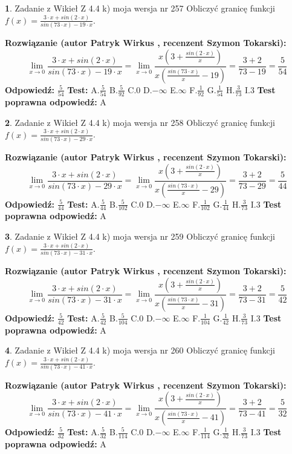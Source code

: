\documentclass[12pt, a4paper]{article}
\theoremstyle{definition} %
\newtheorem{zad}{}
\newcommand{\zadStart}[1]{\begin{zad}#1\newline}
\newcommand{\zadStop}{\end{zad}}
\newcommand{\rozwStart}[2]{\noindent \textbf{Rozwiązanie (autor #1 , recenzent #2): }\newline}
\newcommand{\rozwStop}{\newline}
\newcommand{\odpStart}{\noindent \textbf{Odpowiedź:}\newline}
\newcommand{\odpStop}{\newline}
\newcommand{\testStart}{\noindent \textbf{Test:}\newline}
\newcommand{\testStop}{\newline}
\newcommand{\kluczStart}{\noindent \textbf{Test poprawna odpowiedź:}\newline}
\newcommand{\kluczStop}{\newline}
\begin{document}
\zadStart{Zadanie z Wikieł Z 4.4 k) moja wersja nr 257}
Obliczyć granicę funkcji $f(x)=\frac{3\cdot x +sin(2\cdot x)}{sin(73\cdot x) -19\cdot x}$.
\zadStop
\rozwStart{Patryk Wirkus}{Szymon Tokarski}
$$\lim\limits_{x\to 0}\frac{3\cdot x +sin(2\cdot x)}{sin(73\cdot x) -19\cdot x}
=\lim\limits_{x\to 0}\frac{x(3+\frac{sin(2\cdot x)}{x})}{x(\frac{sin(73\cdot x)}{x}-19)}
=\frac{3+2}{73-19} = \frac{5}{54}$$
\rozwStop
\odpStart
$\frac{5}{54}$
\odpStop
\testStart
A.$\frac{5}{54}$
B.$\frac{5}{92}$
C.$0$
D.$-\infty$
E.$\infty$
F.$\frac{1}{92}$
G.$\frac{1}{54}$
H.$\frac{3}{73}$
I.$3$
\testStop
\kluczStart
A
\kluczStop



\zadStart{Zadanie z Wikieł Z 4.4 k) moja wersja nr 258}
Obliczyć granicę funkcji $f(x)=\frac{3\cdot x +sin(2\cdot x)}{sin(73\cdot x) -29\cdot x}$.
\zadStop
\rozwStart{Patryk Wirkus}{Szymon Tokarski}
$$\lim\limits_{x\to 0}\frac{3\cdot x +sin(2\cdot x)}{sin(73\cdot x) -29\cdot x}
=\lim\limits_{x\to 0}\frac{x(3+\frac{sin(2\cdot x)}{x})}{x(\frac{sin(73\cdot x)}{x}-29)}
=\frac{3+2}{73-29} = \frac{5}{44}$$
\rozwStop
\odpStart
$\frac{5}{44}$
\odpStop
\testStart
A.$\frac{5}{44}$
B.$\frac{5}{102}$
C.$0$
D.$-\infty$
E.$\infty$
F.$\frac{1}{102}$
G.$\frac{1}{44}$
H.$\frac{3}{73}$
I.$3$
\testStop
\kluczStart
A
\kluczStop



\zadStart{Zadanie z Wikieł Z 4.4 k) moja wersja nr 259}
Obliczyć granicę funkcji $f(x)=\frac{3\cdot x +sin(2\cdot x)}{sin(73\cdot x) -31\cdot x}$.
\zadStop
\rozwStart{Patryk Wirkus}{Szymon Tokarski}
$$\lim\limits_{x\to 0}\frac{3\cdot x +sin(2\cdot x)}{sin(73\cdot x) -31\cdot x}
=\lim\limits_{x\to 0}\frac{x(3+\frac{sin(2\cdot x)}{x})}{x(\frac{sin(73\cdot x)}{x}-31)}
=\frac{3+2}{73-31} = \frac{5}{42}$$
\rozwStop
\odpStart
$\frac{5}{42}$
\odpStop
\testStart
A.$\frac{5}{42}$
B.$\frac{5}{104}$
C.$0$
D.$-\infty$
E.$\infty$
F.$\frac{1}{104}$
G.$\frac{1}{42}$
H.$\frac{3}{73}$
I.$3$
\testStop
\kluczStart
A
\kluczStop



\zadStart{Zadanie z Wikieł Z 4.4 k) moja wersja nr 260}
Obliczyć granicę funkcji $f(x)=\frac{3\cdot x +sin(2\cdot x)}{sin(73\cdot x) -41\cdot x}$.
\zadStop
\rozwStart{Patryk Wirkus}{Szymon Tokarski}
$$\lim\limits_{x\to 0}\frac{3\cdot x +sin(2\cdot x)}{sin(73\cdot x) -41\cdot x}
=\lim\limits_{x\to 0}\frac{x(3+\frac{sin(2\cdot x)}{x})}{x(\frac{sin(73\cdot x)}{x}-41)}
=\frac{3+2}{73-41} = \frac{5}{32}$$
\rozwStop
\odpStart
$\frac{5}{32}$
\odpStop
\testStart
A.$\frac{5}{32}$
B.$\frac{5}{114}$
C.$0$
D.$-\infty$
E.$\infty$
F.$\frac{1}{114}$
G.$\frac{1}{32}$
H.$\frac{3}{73}$
I.$3$
\testStop
\kluczStart
A
\kluczStop
\end{document}
